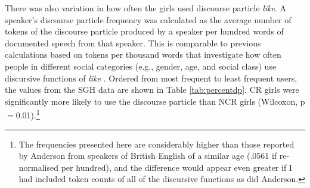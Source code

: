 There was also variation in how often the girls used discourse particle \textit{like}.  A speaker's discourse particle frequency was calculated as the average number of tokens of the discourse particle produced by a speaker per hundred words of documented speech from that speaker.  This is comparable to previous calculations based on tokens per thousand words that investigate how often people in different social categories (e.g., gender, age, and social class) use discursive functions of \textit{like} \cite[287-299]{anderson2001}.  Ordered from most frequent to least frequent users, the values from the SGH data are shown in Table \ref{tab:percentdp}.  CR girls were significantly more likely to use the discourse particle than NCR girls (Wilcoxon, p$=$0.01).\footnote{The frequencies presented here are considerably higher than those reported by Anderson from speakers of British English of a similar age (.0561 if re-normalised per hundred), and the difference would appear even greater if I had included token counts of all of the discursive functions as did Anderson.}  


